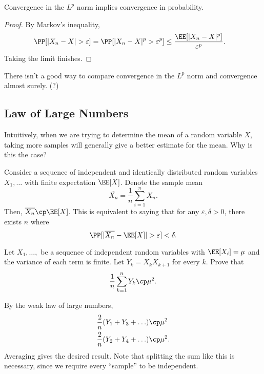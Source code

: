 \begin{theorem}
\lemlabel

Convergence in the $L^p$ norm implies convergence in probability. 
\end{theorem}

\begin{proof}
By Markov's inequality, 
\begin{align*}
    \PP[\vert X_n - X\vert > \varepsilon] &= \PP[\vert X_n - X\vert^p > \varepsilon^p] \leq \frac{\EE[\vert X_n - X\vert ^p]}{\varepsilon^p}.
\end{align*}
Taking the limit finishes. 
\end{proof}

There isn't a good way to compare convergence in the $L^p$ norm and convergence almost surely. (?)

\subsection{Law of Large Numbers}

Intuitively, when we are trying to determine the mean of a random variable $X$, taking more samples will generally give a better estimate for the mean. Why is this the case? 

\begin{theorem}

Consider a sequence of independent and identically distributed random variables $X_1, \hdots$ with finite expectation $\EE[X]$. Denote the sample mean 
\[\overline{X_n} = \frac{1}{n}\sum_{i=1}^nX_n.\]
Then, $\overline{X_n} \cp \EE[X]$. This is equivalent to saying that for any $\varepsilon, \delta > 0$, there exists $n$ where 
\[\PP[\vert \overline{X_n} - \EE[X]\vert > \varepsilon] < \delta.\]
\end{theorem}

\begin{example}
\exlabel

Let $X_1, \hdots,$ be a sequence of independent random variables with $\EE[X_i] = \mu$ and the variance of each term is finite. Let $Y_k = X_kX_{k+1}$ for every $k$. Prove that 
\[\frac{1}{n}\sum_{k=1}^n Y_k\cp \mu^2.\]
\end{example}

By the weak law of large numbers, 
\begin{align*}
    \frac{2}{n}(Y_1 + Y_3 + \hdots) &\cp \mu^2 \\
    \frac{2}{n}(Y_2 + Y_4 + \hdots) &\cp \mu^2.
\end{align*}
Averaging gives the desired result. Note that splitting the sum like this is necessary, since we require every ``sample'' to be independent. 

